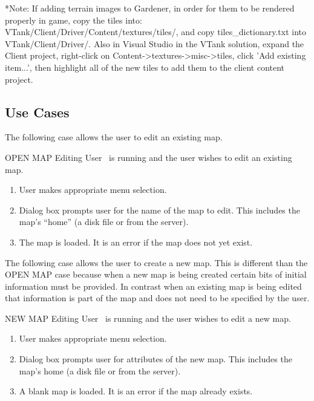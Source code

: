 *Note: If adding terrain images to Gardener, in order for them to be rendered properly in game, copy the tiles into: VTank/Client/Driver/Content/textures/tiles/, and copy tiles\_dictionary.txt into VTank/Client/Driver/. Also in Visual Studio in the VTank solution, expand the Client project, right-click on Content->textures->misc->tiles, click 'Add existing item...', then highlight all of the new tiles to add them to the client content project.

\subsection{Use Cases}

The following case allows the user to edit an existing map.

\begin{usecase}
  {OPEN MAP}
  {Editing User}
  {\MapEditor\ is running and the user wishes to edit an existing map.}
\begin{enumerate}
\item User makes appropriate menu selection.
\item Dialog box prompts user for the name of the map to edit. This includes the map's ``home'' (a disk file or from the server).
\item The map is loaded. It is an error if the map does not yet exist.
\end{enumerate}
\end{usecase}

The following case allows the user to create a new map. This is different than the OPEN MAP case because when a new map is being created certain bits of initial information must be provided. In contrast when an existing map is being edited that information is part of the map and does not need to be specified by the user.

\begin{usecase}
  {NEW MAP}
  {Editing User}
  {\MapEditor\ is running and the user wishes to edit a new map.}
\begin{enumerate}
\item User makes appropriate menu selection.
\item Dialog box prompts user for attributes of the new map. This includes the map's home (a disk file or from the server).
\item A blank map is loaded. It is an error if the map already exists.
\end{enumerate}
\end{usecase}

